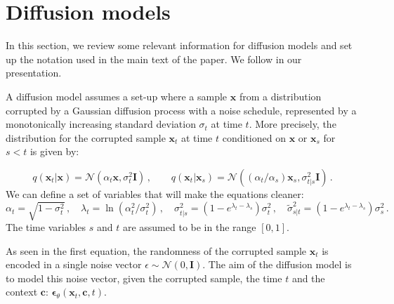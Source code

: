 \documentclass[nohyperref]{article}
\theoremstyle{plain}
\theoremstyle{definition}
\theoremstyle{remark}
\begin{document}




\newpage
\appendix
\onecolumn

\section{Diffusion models}
\label{app:diffusion}

In this section, we review some relevant information for diffusion models and set up the notation used in the main text of the paper. We follow \cite{saharia2022photorealistic} in our presentation.

A diffusion model assumes a set-up where a sample $\mathbf{x}$ from a distribution corrupted by a Gaussian diffusion process with a noise schedule, represented by a monotonically increasing standard deviation $\sigma_t$ at time $t$. More precisely, the distribution for the corrupted sample $\mathbf{x}_t$ at time $t$ conditioned on $\mathbf{x}$ or $\mathbf{x}_s$ for $s < t$ is given by:


\begin{equation}
q(\mathbf{x}_t |\mathbf{x}) = \mathcal{N}(\alpha_t \mathbf{x}, \sigma_t^2 \mathbf{I}) \,, \qquad
q(\mathbf{x}_t |\mathbf{x}_s) = \mathcal{N}((\alpha_t/\alpha_s) \mathbf{x}_s, \sigma_{t|s}^2 \mathbf{I}) \,.
\end{equation}
We can define a set of variables that will make the equations cleaner:
\begin{equation}
\alpha_t = \sqrt{1 - \sigma_t^2} \,, \quad
\lambda_t = \ln(\alpha_t^2/\sigma_t^2) \,, \quad
\sigma_{t|s}^2 = (1 - e^{\lambda_t - \lambda_s}) \sigma_t^2 \,, \quad
\tilde{\sigma}_{s|t}^2 = (1 - e^{\lambda_t - \lambda_s}) \sigma_s^2 \,.
\end{equation}
The time variables $s$ and $t$ are assumed to be in the range $[0, 1]$.

As seen in the first equation, the randomness of the corrupted sample $\mathbf{x}_t$ is encoded in a single noise vector $\epsilon \sim \mathcal{N}(0, \mathbf{I})$. The aim of the diffusion model is to model this noise vector, given the corrupted sample, the time $t$ and the context $\mathbf{c}$: $\bm{\epsilon}_\theta(\mathbf{x}_t, \mathbf{c}, t)$.
\end{document}
